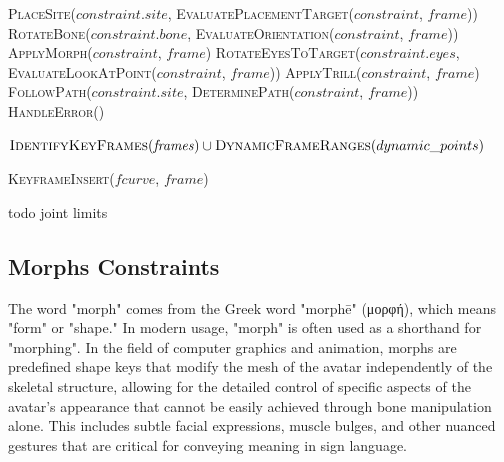 \documentclass[../../main.tex]{subfiles}
\begin{document}
\begin{algorithm}
\begin{algorithmic}[1]
                \State \textsc{PlaceSite}($constraint.site$, \textsc{EvaluatePlacementTarget}($constraint$, $frame$))
                \State \textsc{RotateBone}($constraint.bone$, \textsc{EvaluateOrientation}($constraint$, $frame$))
                \State \textsc{ApplyMorph}($constraint$, $frame$)
                \State \textsc{RotateEyesToTarget}($constraint.eyes$, \textsc{EvaluateLookAtPoint}($constraint$, $frame$))
                \State \textsc{ApplyTrill}($constraint$, $frame$)
                \State \textsc{FollowPath}($constraint.site$, \textsc{DeterminePath}($constraint$, $frame$))
            \Else
                \State \textsc{HandleError}()
            \EndIf
        \EndProcedure
        
            \State \Return $\textsc{IdentifyKeyFrames}(\mathit{frames}) \cup \textsc{DynamicFrameRanges}(dynamic\_points)$
        \EndProcedure
        
                \State \textsc{KeyframeInsert}($fcurve$, $frame$)
            \EndFor
        \EndProcedure
    \end{algorithmic}
\end{algorithm}

todo joint limits

\subsection{Morphs Constraints}
\label{ch:rigging_layers:proc_rig_signing_avatars:morph_constraints}

The word "morph" comes from the Greek word "morphē" (μορφή), which means "form" or "shape." In modern usage, "morph" is often used as a shorthand for "morphing". In the field of computer graphics and animation, morphs are predefined shape keys that modify the mesh of the avatar independently of the skeletal structure, allowing for the detailed control of specific aspects of the avatar's appearance that cannot be easily achieved through bone manipulation alone. This includes subtle facial expressions, muscle bulges, and other nuanced gestures that are critical for conveying meaning in sign language.
\end{document}
